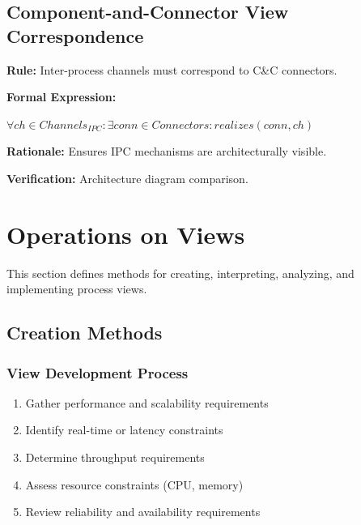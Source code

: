 \documentclass[11pt,letterpaper]{article}
\begin{document}
\subsection{Component-and-Connector View Correspondence}

\begin{definitionbox}
\textbf{Rule:} Inter-process channels must correspond to C\&C connectors.

\textbf{Formal Expression:}
\begin{center}
$\forall ch \in Channels_{IPC} : \exists conn \in Connectors : realizes(conn, ch)$
\end{center}

\textbf{Rationale:} Ensures IPC mechanisms are architecturally visible.

\textbf{Verification:} Architecture diagram comparison.
\end{definitionbox}

\section{Operations on Views}

This section defines methods for creating, interpreting, analyzing, and implementing process views.

\subsection{Creation Methods}

\subsubsection{View Development Process}

\begin{guidancebox}
\begin{enumerate}[nosep]
    \item Gather performance and scalability requirements
    \item Identify real-time or latency constraints
    \item Determine throughput requirements
    \item Assess resource constraints (CPU, memory)
    \item Review reliability and availability requirements
\end{enumerate}
\end{guidancebox}
\end{document}
